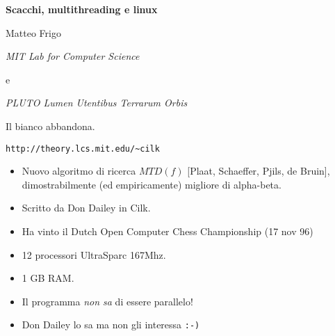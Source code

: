 \documentclass[times,sans-serif]{athenaslides}
\begin{document}
\begin{slide}
  \bigskip\someglue
  \begin{center}
    \begin{LARGE}
      \begin{Blue}
        \bf
        Scacchi, multithreading e linux
      \end{Blue}
    \end{LARGE}
    \bigskip\someglue
    \begin{large}
      Matteo Frigo
    \end{large}
    \bigskip\someglue
    \begin{large}
      \sl 
      MIT Lab for Computer Science
    \end{large}
    \medskip
    \begin{large}
      e
    \end{large}
    \medskip
    \begin{large}
      \sl 
      PLUTO Lumen Utentibus Terrarum Orbis
    \end{large}
    \bigskip
  \end{center}
\end{slide}
\begin{slide}
  \smallskip
  Il bianco abbandona.
  \smallskip
  \centerline{\texttt{http://theory.lcs.mit.edu/\textasciitilde{}cilk}}
\end{slide}
\begin{slide}[Cilkchess]
  \begin{itemize}
  \item Nuovo algoritmo di ricerca $MTD(f)$ [Plaat, Schaeffer, Pjils,
    de Bruin], dimostrabilmente (ed empiricamente) migliore di 
    alpha-beta.
  \item Scritto da Don Dailey in Cilk.
  \item Ha vinto il Dutch Open Computer Chess Championship (17 nov 96)
  \item 12 processori UltraSparc 167Mhz.
  \item 1 GB RAM.
  \item Il programma \emph{non sa} di essere parallelo!
  \item Don Dailey lo sa ma non gli interessa \texttt{:-)}
  \end{itemize}
\end{slide}
\end{document}
